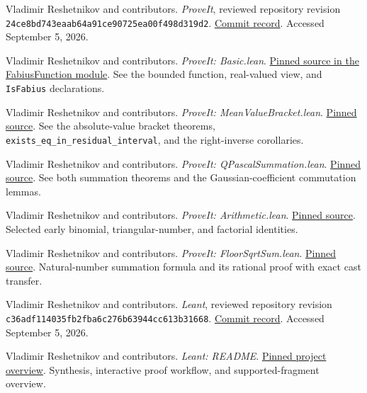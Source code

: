 \documentclass[11pt,a4paper]{article}
\newcommand{\code}[1]{\nolinkurl{#1}}
\newcommand{\psource}[2]{\href{https://github.com/VladimirReshetnikov/ProveIt/blob/24ce8bd743eaab64a91ce90725ea00f498d319d2/#1}{#2}}
\newcommand{\lsource}[2]{\href{https://github.com/VladimirReshetnikov/Leant/blob/c36adf114035fb2fba6c276b63944cc613b31668/#1}{#2}}
\theoremstyle{definition}
\theoremstyle{remark}
\numberwithin{equation}{section}
\begin{document}
\clearpage
{}
{}
\begin{thebibliography}{99}
\small
{}
Vladimir Reshetnikov and contributors.
\emph{ProveIt}, reviewed repository revision
\code{24ce8bd743eaab64a91ce90725ea00f498d319d2}.
\href{https://github.com/VladimirReshetnikov/ProveIt/commit/24ce8bd743eaab64a91ce90725ea00f498d319d2}{Commit record}.
Accessed September 5, 2026.

Vladimir Reshetnikov and contributors.
\emph{ProveIt: Basic.lean}.
\psource{Analysis/FabiusFunction/Lean/FabiusFunction/Basic.lean}{Pinned source in the FabiusFunction module}.
See the bounded function, real-valued view, and \code{IsFabius} declarations.

Vladimir Reshetnikov and contributors.
\emph{ProveIt: MeanValueBracket.lean}.
\psource{Analysis/FabiusFunction/Lean/FabiusFunction/MeanValueBracket.lean}{Pinned source}.
See the absolute-value bracket theorems, \code{exists_eq_in_residual_interval}, and the right-inverse corollaries.

Vladimir Reshetnikov and contributors.
\emph{ProveIt: QPascalSummation.lean}.
\psource{Analysis/FabiusFunction/Lean/FabiusFunction/QPascalSummation.lean}{Pinned source}.
See both summation theorems and the Gaussian-coefficient commutation lemmas.

Vladimir Reshetnikov and contributors.
\emph{ProveIt: Arithmetic.lean}.
\psource{Analysis/FabiusFunction/Lean/FabiusFunction/Arithmetic.lean}{Pinned source}.
Selected early binomial, triangular-number, and factorial identities.

Vladimir Reshetnikov and contributors.
\emph{ProveIt: FloorSqrtSum.lean}.
\psource{NumberTheory/IntegerSums/Lean/IntegerSums/FloorSqrtSum.lean}{Pinned source}.
Natural-number summation formula and its rational proof with exact cast transfer.

Vladimir Reshetnikov and contributors.
\emph{Leant}, reviewed repository revision
\code{c36adf114035fb2fba6c276b63944cc613b31668}.
\href{https://github.com/VladimirReshetnikov/Leant/commit/c36adf114035fb2fba6c276b63944cc613b31668}{Commit record}.
Accessed September 5, 2026.

Vladimir Reshetnikov and contributors.
\emph{Leant: README}.
\lsource{README.md}{Pinned project overview}.
Synthesis, interactive proof workflow, and supported-fragment overview.


\end{thebibliography}
\end{document}
